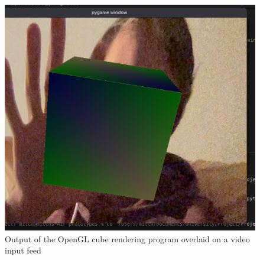 \begin{figure}[h]
    \centering
    \includegraphics[width=0.6\linewidth]{figures/OpenGL_cube1.png}
    \caption{Output of the OpenGL cube rendering program overlaid on a video input feed}
    \label{fig:OpenGL_cube1.png}
\end{figure}